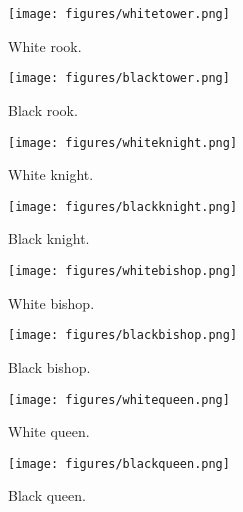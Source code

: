 \documentclass[12pt, a4paper]{article}
\begin{document}
\begin{figure}[h!]
\centering
\begin{minipage}{.5\textwidth}
  \centering
  \texttt{[image: figures/whitetower.png]}
  \caption{White rook.}
\end{minipage}%
\begin{minipage}{.5\textwidth}
  \centering
  \texttt{[image: figures/blacktower.png]}
  \caption{Black rook.}
\end{minipage}
\end{figure}

\begin{figure}[h!]
\centering
\begin{minipage}{.5\textwidth}
  \centering
  \texttt{[image: figures/whiteknight.png]}
  \caption{White knight.}
\end{minipage}%
\begin{minipage}{.5\textwidth}
  \centering
  \texttt{[image: figures/blackknight.png]}
  \caption{Black knight.}
\end{minipage}
\end{figure}

\vfill
\clearpage

\newpage
\vfill

\begin{figure}[h!]
\centering
\begin{minipage}{.5\textwidth}
  \centering
  \texttt{[image: figures/whitebishop.png]}
  \caption{White bishop.}
\end{minipage}%
\begin{minipage}{.5\textwidth}
  \centering
  \texttt{[image: figures/blackbishop.png]}
  \caption{Black bishop.}
\end{minipage}
\end{figure}

\begin{figure}[h!]
\centering
\begin{minipage}{.5\textwidth}
  \centering
  \texttt{[image: figures/whitequeen.png]}
  \caption{White queen.}
\end{minipage}%
\begin{minipage}{.5\textwidth}
  \centering
  \texttt{[image: figures/blackqueen.png]}
  \caption{Black queen.}
\end{minipage}
\end{figure}
\end{document}
